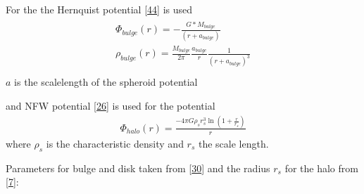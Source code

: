 \documentclass[letterpaper,10pt,english]{sphinxmanual}
\begin{document}
\sphinxAtStartPar
For the  the Hernquist potential {[}\hyperlink{cite.NBodySimulation/Appendix:id6}{44}{]} is used
\begin{align*}\!\begin{aligned}
\Phi_{bulge}\left ( r \right ) = -\frac{G*M_{bulge}}{\left ( r+a_{bulge} \right )}\\
\rho_{bulge}(r)= \frac{M_{bulge}}{2\pi }\frac{a_{bulge}}{r}\frac{1}{\left ( r+a_{bulge} \right )^{3}}\\
\end{aligned}\end{align*}
\sphinxAtStartPar
\(a\) is the scale\sphinxhyphen{}length of the spheroid potential

\sphinxAtStartPar
and NFW potential {[}\hyperlink{cite.NBodySimulation/Appendix:id59}{26}{]} is used for the  potential
\begin{equation*}
\begin{split}\Phi_{halo}\left ( r \right ) = \frac{-4\pi G\rho _{s}r_{s}^{3}\ln\left ( 1+\frac{r}{r_{s}}\right )}{r}\end{split}
\end{equation*}
\sphinxAtStartPar
where \(\rho _{s}\) is the characteristic density and \(r_{s}\) the scale length.

\sphinxAtStartPar
Parameters for bulge and disk taken from {[}\hyperlink{cite.NBodySimulation/Appendix:id4}{30}{]} and the radius \(r_{s}\) for the halo from {[}\hyperlink{cite.NBodySimulation/Appendix:id5}{7}{]}:
\end{document}
